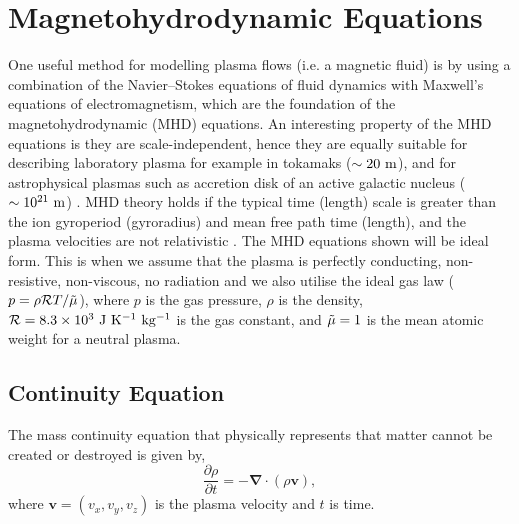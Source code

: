\documentclass[12pt]{ociamthesis}
\newcommand{\bs}[1]{\boldsymbol{#1}}
\newcommand{\bn}{\boldsymbol{\nabla}}
\newcommand{\rgas}{\mathcal{R}}
\begin{document}
\section{Magnetohydrodynamic Equations}
\label{section:MHD_eqs}
One useful method for modelling plasma flows (i.e. a magnetic fluid) is by using a combination of the Navier–Stokes equations of fluid dynamics with Maxwell's equations of electromagnetism, which are the foundation of the magnetohydrodynamic (MHD) equations. An interesting property of the MHD equations is they are scale-independent, hence they are equally suitable for describing laboratory plasma for example in tokamaks ($\sim 20~\rm{m}$), and for astrophysical plasmas such as accretion disk of an active galactic nucleus ($\sim 10^{21}~\rm{m}$) \citep{goedbloed2004principles}. MHD theory holds if the typical time (length) scale is greater than the ion gyroperiod (gyroradius) and mean free path time (length), and the plasma velocities are not relativistic \citep{priest2014magnetohydrodynamics}. The MHD equations shown will be ideal form. This is when we assume that the plasma is perfectly conducting, non-resistive, non-viscous, no radiation and we also utilise the ideal gas law ($p = \rho \rgas T/\Tilde{\mu}$), where $p$ is the gas pressure, $\rho$ is the density, $\rgas=8.3\times 10^{3}~\rm{J~K^{-1}~kg^{-1}}$ is the gas constant, and $\Tilde{\mu}=1$ is the mean atomic weight for a neutral plasma.
\subsection{Continuity Equation}
\label{section:cont_eq}
The mass continuity equation that physically represents that matter cannot be created or destroyed is given by,
\begin{equation}\label{eq86}
\frac{\partial \rho}{\partial t} = - \bn \cdot (\rho \boldsymbol{v}),
\end{equation}
where $\bs{v}=(v_x,v_y,v_z)$ is the plasma velocity and $t$ is time. 
\end{document}
